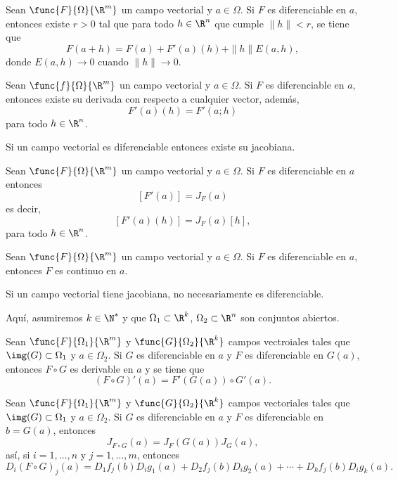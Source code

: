 \documentclass[a4,11pt]{aleph-notas}
\begin{document}
\begin{prop}
    Sean $\func{F}{\Omega}{\R^m}$ un campo vectorial y $a\in \Omega$. Si $F$ es diferenciable en $a$, entonces existe $r>0$ tal que para todo $h\in\R^n$ que cumple $\|h\|<r$, se tiene que
    \[
        F(a+h)=F(a)+F'(a)(h)+\|h\|E(a,h),
    \]
    donde $E(a,h)\to 0$ cuando $\|h\|\to 0$.
\end{prop}

\begin{prop}
    Sean $\func{f}{\Omega}{\R^m}$ un campo vectorial y $a\in \Omega$. Si $F$ es diferenciable en $a$, entonces existe su derivada con respecto a cualquier vector, además,
    \[
        F'(a)(h)=F'(a;h)
    \]
    para todo $h\in\R^n$.
\end{prop}

\begin{advertencia}
    Si un campo vectorial es diferenciable entonces existe su jacobiana.
\end{advertencia}

\begin{teo}
    Sean $\func{F}{\Omega}{\R^m}$ un campo vectorial y $a\in \Omega$. Si $F$ es diferenciable en $a$ entonces
    \[
        [F'(a)]=J_F(a)
    \]
    es decir, 
    \[
        [F'(a)(h)]=J_F(a) [h],
    \]
    para todo $h\in\R^n$.
\end{teo}

\begin{teo}
    Sean $\func{F}{\Omega}{\R^m}$ un campo vectorial y $a\in \Omega$. Si $F$ es diferenciable en $a$, entonces $F$ es continuo en $a$.
\end{teo}

\begin{advertencia}
    Si un campo vectorial tiene jacobiana, no necesariamente es diferenciable.
\end{advertencia}

Aquí, asumiremos $k\in\N^*$ y que $\Omega_1\subset \R^k$, $\Omega_2\subset \R^n$ son conjuntos abiertos.

\begin{teo}
    Sean $\func{F}{\Omega_1}{\R^m}$ y $\func{G}{\Omega_2}{\R^k}$ campos vectroiales tales que $\img(G)\subset \Omega_1$ y $a\in \Omega_2$. Si $G$ es diferenciable en $a$ y $F$ es diferenciable en $G(a)$, entonces $F\circ G$ es derivable en $a$ y se tiene que
    \[
        (F\circ G)'(a) = F'(G(a))\circ G'(a).
    \]
\end{teo}

\begin{prop}
    Sean $\func{F}{\Omega_1}{\R^m}$ y $\func{G}{\Omega_2}{\R^k}$ campos vectoriales tales que $\img(G)\subset \Omega_1$ y $a\in \Omega_2$. Si $G$ es diferenciable en $a$ y $F$ es diferenciable en $b=G(a)$, entonces 
    \[
        J_{F\circ G}(a) = J_F(G(a)) J_G(a),
    \]
    así, si $i=1,\ldots,n$ y $j=1,\ldots,m$, entonces
    \[
        D_i (F\circ G)_j(a) = D_1 f_j(b) D_i g_1(a) + D_2 f_j(b) D_i g_2(a) + \cdots + D_k f_j(b) D_i g_k(a).
    \]
\end{prop}
\end{document}
